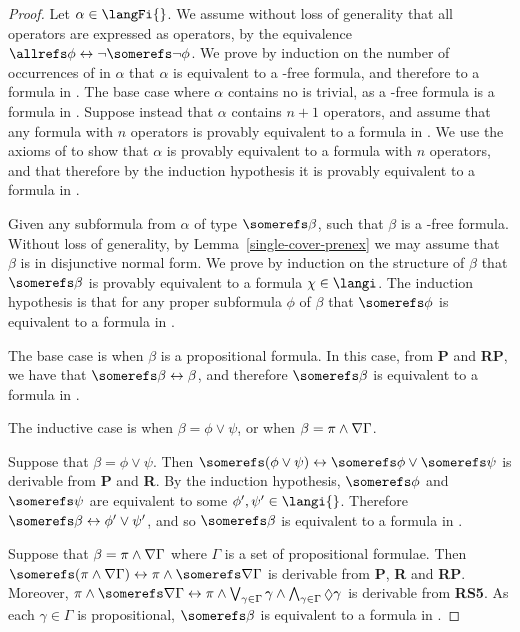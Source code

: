 \begin{proof}
Let $\alpha \in \langFi{}$. We assume without loss of generality that all
\allrefs{} operators are expressed as \somerefs{} operators, by the equivalence
$\allrefs \phi \iff \neg \somerefs \neg \phi$. We prove by induction on the
number of occurrences of \somerefs{} in $\alpha$ that $\alpha$ is equivalent to
a \somerefs{}-free formula, and therefore to a formula in \langi{}. The base case
where $\alpha$ contains no \somerefs{} is trivial, as a \somerefs{}-free formula
is a formula in \langi{}. Suppose instead that $\alpha$ contains $n + 1$
\somerefs{} operators, and assume that any formula with $n$ \somerefs{}
operators is provably equivalent to a formula in \langi{}. We use the axioms of
\axiomSiF{} to show that $\alpha$ is provably equivalent to a formula with $n$
\somerefs{} operators, and that therefore by the induction hypothesis it is
provably equivalent to a formula in \langi{}.

Given any subformula from $\alpha$ of type $\somerefs \beta$, such that $\beta$
is a \somerefs{}-free formula. Without loss of generality, by
Lemma~\ref{single-cover-prenex} we may assume that $\beta$ is in disjunctive
normal form. We prove by induction on the structure of $\beta$ that $\somerefs
\beta$ is provably equivalent to a formula $\chi \in \langi$. The induction
hypothesis is that for any proper subformula $\phi$ of $\beta$ that $\somerefs
\phi$ is equivalent to a formula in \langi{}.

The base case is when $\beta$ is a propositional formula. In this case, from
{\bf P} and {\bf RP}, we have that $\somerefs \beta \iff \beta$, and therefore
$\somerefs \beta$ is equivalent to a formula in \langi{}.

The inductive case is when $\beta = \phi \lor \psi$, or when $\beta = \pi \land
\nabla \Gamma$. 

Suppose that $\beta = \phi \lor \psi$. Then $\somerefs (\phi \lor \psi) \iff
\somerefs \phi \lor \somerefs \psi$ is derivable from {\bf P} and {\bf R}. By
the induction hypothesis, $\somerefs \phi$ and $\somerefs \psi$ are equivalent
to some $\phi', \psi' \in \langi{}$. Therefore $\somerefs \beta \iff \phi' \lor
\psi'$, and so $\somerefs \beta$ is equivalent to a formula in \langi{}.

Suppose that $\beta = \pi \land \nabla \Gamma$ where $\Gamma$ is a set of
propositional formulae. Then $\somerefs (\pi \land \covers \Gamma) \iff
\pi \land \somerefs \covers \Gamma$ is derivable from {\bf P}, {\bf R} and {\bf
RP}. Moreover, $\pi \land \somerefs \covers \Gamma \iff \pi \land
\bigvee_{\gamma \in \Gamma} \gamma \land \bigwedge_{\gamma \in \Gamma} \suspects
\gamma$ is derivable from {\bf RS5}. As each $\gamma \in \Gamma$ is
propositional, $\somerefs \beta$ is equivalent to a formula in \langi{}.


\end{proof}
